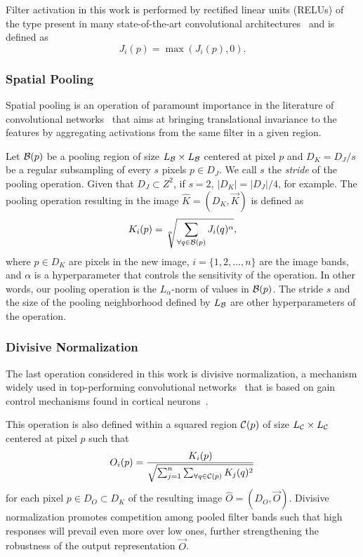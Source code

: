 Filter activation in this work is performed by rectified linear units (RELUs) of the type present in many state-of-the-art convolutional architectures~\cite{Krizhevsky:2012,Pinto:2011b} and is defined as
\begin{equation}
J_i(p) = \max(J_i(p),0).
\end{equation}

\subsubsection{Spatial Pooling}

Spatial pooling is an operation of paramount importance in the literature of convolutional networks~\cite{LeCun:1998} that aims at bringing translational invariance to the features by aggregating activations from the same filter in a given region. 

Let ${\cal B}(p)$ be a pooling region of size $L_{\cal B} \times L_{\cal B}$ centered at pixel $p$ and $D_K = D_J/s$ be a regular subsampling of every $s$ pixels $p \in D_J$. We call $s$ the \emph{stride} of the pooling operation. Given that $D_J \subset Z^2$, if $s=2$, $|D_K| = |D_J|/4$, for example.
The pooling operation resulting in the image $\hat{K}=(D_K,\vec{K})$  is defined as 
\begin{equation}
K_i(p) = \sqrt[\alpha]{\sum_{\forall q\in {\cal B}(p)} J_i(q)^{\alpha}}, 
\end{equation}
where $p\in D_K$ are pixels in the new image, $i=\{1,2,\ldots,n\}$ are the image bands, and $\alpha$ is a hyperparameter that controls the sensitivity of the operation. In other words, our pooling operation is the $L_{\alpha}$-norm of values in ${\cal B}(p)$. 
The stride $s$ and the size of the pooling neighborhood defined by $L_{\cal B}$ are other hyperparameters of the operation.

\subsubsection{Divisive Normalization}

The last operation considered in this work is divisive normalization, a mechanism widely used in top-performing convolutional networks~\cite{Krizhevsky:2012,Pinto:2011b} that is based on gain control mechanisms found in cortical neurons~\cite{Geisler:1992}.

This operation is also defined within a squared region ${\cal C}(p)$ of size $L_{\cal C} \times L_{\cal C}$ centered at pixel $p$ such that 
\begin{equation}
O_i(p) = \frac{K_i(p)}{\sqrt{\sum_{j=1}^{n}\sum_{\forall q\in {\cal C}(p)} K_j(q)^2}}
\end{equation}
for each pixel $p\in D_O \subset D_K$ of the resulting image $\hat{O}=(D_O,\vec{O})$. Divisive normalization promotes competition among pooled filter bands such that high responses will prevail even more over low ones, further strengthening the robustness of the output representation $\vec{O}$.
